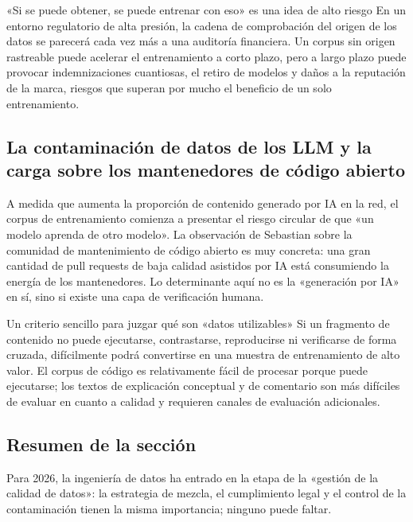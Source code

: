 \begin{warningbox}{«Si se puede obtener, se puede entrenar con eso» es una idea de alto riesgo}
En un entorno regulatorio de alta presión, la cadena de comprobación del origen de los datos se parecerá cada vez más a una auditoría financiera. Un corpus sin origen rastreable puede acelerar el entrenamiento a corto plazo, pero a largo plazo puede provocar indemnizaciones cuantiosas, el retiro de modelos y daños a la reputación de la marca, riesgos que superan por mucho el beneficio de un solo entrenamiento.
\end{warningbox}

\subsection{La contaminación de datos de los LLM y la carga sobre los mantenedores de código abierto}

A medida que aumenta la proporción de contenido generado por IA en la red, el corpus de entrenamiento comienza a presentar el riesgo circular de que «un modelo aprenda de otro modelo». La observación de Sebastian sobre la comunidad de mantenimiento de código abierto es muy concreta: una gran cantidad de pull requests de baja calidad asistidos por IA está consumiendo la energía de los mantenedores. Lo determinante aquí no es la «generación por IA» en sí, sino si existe una capa de verificación humana.

\begin{knowledgebox}{Un criterio sencillo para juzgar qué son «datos utilizables»}
Si un fragmento de contenido no puede ejecutarse, contrastarse, reproducirse ni verificarse de forma cruzada, difícilmente podrá convertirse en una muestra de entrenamiento de alto valor. El corpus de código es relativamente fácil de procesar porque puede ejecutarse; los textos de explicación conceptual y de comentario son más difíciles de evaluar en cuanto a calidad y requieren canales de evaluación adicionales.
\end{knowledgebox}

\subsection{Resumen de la sección}

Para 2026, la ingeniería de datos ha entrado en la etapa de la «gestión de la calidad de datos»: la estrategia de mezcla, el cumplimiento legal y el control de la contaminación tienen la misma importancia; ninguno puede faltar.

